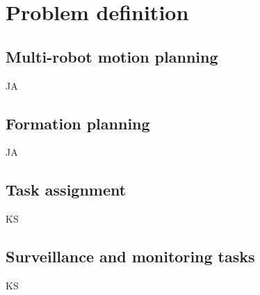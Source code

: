 
\section{Problem definition}\label{sec:2}

\subsection{Multi-robot motion planning}
JA

\subsection{Formation planning}
JA

\subsection{Task assignment}
KS

\subsection{Surveillance and monitoring tasks}
KS


